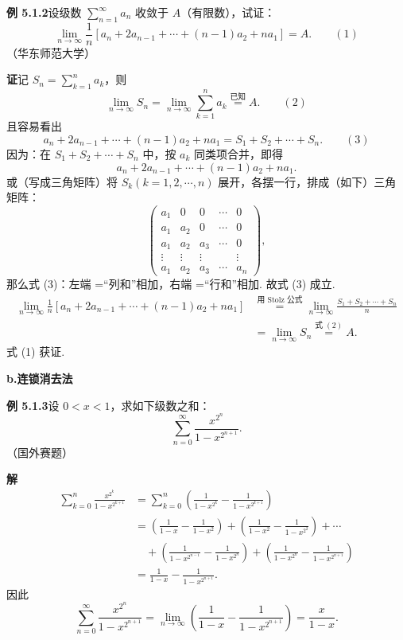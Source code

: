\documentclass[UTF8, 12pt, fontset=fandol, oneside]{ctexart}
\begin{document}
\noindent\textbf{例 5.1.2}\quad 设级数 $\displaystyle\sum_{n=1}^\infty a_n$ 收敛于 $A$（有限数），试证：
\[
  \lim_{n\to\infty}\frac1n\left[a_n+2a_{n-1}+\cdots+(n-1)a_2+na_1\right]=A.
\qquad(1)
\]
（华东师范大学）

\noindent\textbf{证}\quad 记 $S_n=\displaystyle\sum_{k=1}^n a_k$，则
\[
  \lim_{n\to\infty}S_n=\lim_{n\to\infty}\sum_{k=1}^n a_k\stackrel{\text{已知}}{=}A.
\qquad(2)
\]
且容易看出
\[
  a_n+2a_{n-1}+\cdots+(n-1)a_2+na_1=S_1+S_2+\cdots+S_n.
\qquad(3)
\]
因为：在 $S_1+S_2+\cdots+S_n$ 中，按 $a_k$ 同类项合并，即得
\[
  a_n+2a_{n-1}+\cdots+(n-1)a_2+na_1.
\]
或（写成三角矩阵）将 $S_k(k=1,2,\cdots,n)$ 展开，各摆一行，排成（如下）三角矩阵：
\[
\begin{pmatrix}
a_1&0&0&\cdots&0\\
a_1&a_2&0&\cdots&0\\
a_1&a_2&a_3&\cdots&0\\
\vdots&\vdots&\vdots& &\vdots\\
a_1&a_2&a_3&\cdots&a_n
\end{pmatrix},
\]
那么式 (3)：左端 =“列和”相加，右端 =“行和”相加. 故式 (3) 成立.
\[
\begin{aligned}
\lim_{n\to\infty}\frac1n\left[a_n+2a_{n-1}+\cdots+(n-1)a_2+na_1\right]
&\stackrel{\text{用 Stolz 公式}}{=}
\lim_{n\to\infty}\frac{S_1+S_2+\cdots+S_n}{n}\\
&=\lim_{n\to\infty}S_n\stackrel{\text{式 }(2)}{=}A.
\end{aligned}
\]
式 (1) 获证.

\noindent\textbf{b.\quad 连锁消去法}

\noindent\textbf{例 5.1.3}\quad 设 $0<x<1$，求如下级数之和：
\[
  \sum_{n=0}^\infty \frac{x^{2^n}}{1-x^{2^{n+1}}}.
\]
（国外赛题）

\noindent\textbf{解}\quad
\[
\begin{aligned}
\sum_{k=0}^n \frac{x^{2^k}}{1-x^{2^{k+1}}}
&=\sum_{k=0}^n\left(\frac1{1-x^{2^k}}-\frac1{1-x^{2^{k+1}}}\right)\\
&=\left(\frac1{1-x}-\frac1{1-x^2}\right)
 +\left(\frac1{1-x^2}-\frac1{1-x^{2^2}}\right)+\cdots\\
&\quad+\left(\frac1{1-x^{2^{n-1}}}-\frac1{1-x^{2^n}}\right)
 +\left(\frac1{1-x^{2^n}}-\frac1{1-x^{2^{n+1}}}\right)\\
&=\frac1{1-x}-\frac1{1-x^{2^{n+1}}}.
\end{aligned}
\]
因此
\[
  \sum_{n=0}^\infty \frac{x^{2^n}}{1-x^{2^{n+1}}}
  =\lim_{n\to\infty}\left(\frac1{1-x}-\frac1{1-x^{2^{n+1}}}\right)
  =\frac{x}{1-x}.
\]
\end{document}
